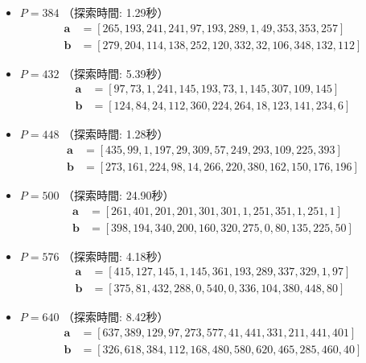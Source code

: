 \documentclass[a4paper,11pt,dvipdfmx]{jsarticle}
\theoremstyle{definition}
\begin{document}
\begin{itemize}
    \item \textbf{$P = 384$} （探索時間: 1.29秒）
    \begin{align*}
        \bm{a} &= [265, 193, 241, 241, 97, 193, 289, 1, 49, 353, 353, 257] \\
        \bm{b} &= [279, 204, 114, 138, 252, 120, 332, 32, 106, 348, 132, 112]
    \end{align*}

    \item \textbf{$P = 432$} （探索時間: 5.39秒）
    \begin{align*}
        \bm{a} &= [97, 73, 1, 241, 145, 193, 73, 1, 145, 307, 109, 145] \\
        \bm{b} &= [124, 84, 24, 112, 360, 224, 264, 18, 123, 141, 234, 6]
    \end{align*}

    \item \textbf{$P = 448$} （探索時間: 1.28秒）
    \begin{align*}
        \bm{a} &= [435, 99, 1, 197, 29, 309, 57, 249, 293, 109, 225, 393] \\
        \bm{b} &= [273, 161, 224, 98, 14, 266, 220, 380, 162, 150, 176, 196]
    \end{align*}

    \item \textbf{$P = 500$} （探索時間: 24.90秒）
    \begin{align*}
        \bm{a} &= [261, 401, 201, 201, 301, 301, 1, 251, 351, 1, 251, 1] \\
        \bm{b} &= [398, 194, 340, 200, 160, 320, 275, 0, 80, 135, 225, 50]
    \end{align*}

    \item \textbf{$P = 576$} （探索時間: 4.18秒）
    \begin{align*}
        \bm{a} &= [415, 127, 145, 1, 145, 361, 193, 289, 337, 329, 1, 97] \\
        \bm{b} &= [375, 81, 432, 288, 0, 540, 0, 336, 104, 380, 448, 80]
    \end{align*}

    \item \textbf{$P = 640$} （探索時間: 8.42秒）
    \begin{align*}
        \bm{a} &= [637, 389, 129, 97, 273, 577, 41, 441, 331, 211, 441, 401] \\
        \bm{b} &= [326, 618, 384, 112, 168, 480, 580, 620, 465, 285, 460, 40]
    \end{align*}


\end{itemize}
\end{document}
